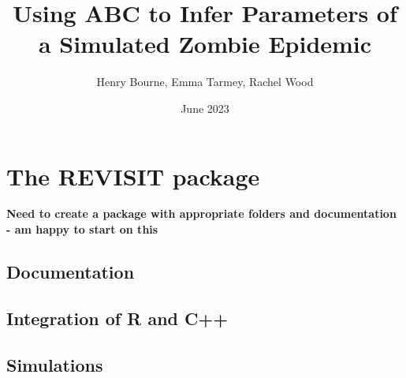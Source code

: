 \documentclass[
]{article}
\title{Using ABC to Infer Parameters of a Simulated Zombie Epidemic}
\author{Henry Bourne, Emma Tarmey, Rachel Wood}
\date{June 2023}
\begin{document}
\maketitle

\hypertarget{the-revisit-package}{%
\section{The REVISIT package}\label{the-revisit-package}}

\textbf{Need to create a package with appropriate folders and documentation - am happy to start on this}

\hypertarget{documentation}{%
\subsection{Documentation}\label{documentation}}

\hypertarget{integration-of-r-and-c}{%
\subsection{Integration of R and C++}\label{integration-of-r-and-c}}

\hypertarget{simulations}{%
\subsection{Simulations}\label{simulations}}
\end{document}
